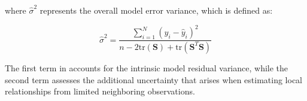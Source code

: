 \noindent where $\hat{\sigma}^2$ represents the overall model error variance, which is defined as:

\begin{equation}
	\hat{\sigma}^2 = \frac{\sum_{i=1}^{N} (y_i - \hat{y}_i)^2}{n - 2\text{tr}(\mathbf{S}) + \text{tr}(\mathbf{S}^T \mathbf{S})}
	\label{eq:model_error_variance}
\end{equation}

The first term in  accounts for the intrinsic model residual variance, while the second term assesses the additional uncertainty that arises when estimating local relationships from limited neighboring observations.


